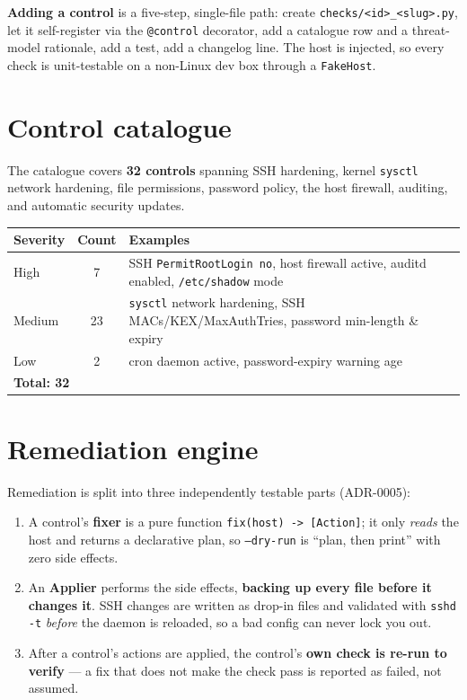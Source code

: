 \documentclass[11pt,a4paper]{article}
\begin{document}
\noindent\textbf{Adding a control} is a five-step, single-file path: create
\texttt{checks/<id>\_<slug>.py}, let it self-register via the \texttt{@control} decorator, add a
catalogue row and a threat-model rationale, add a test, add a changelog line. The host is
injected, so every check is unit-testable on a non-Linux dev box through a \texttt{FakeHost}.

\section{Control catalogue}
The catalogue covers \textbf{32 controls} spanning SSH hardening, kernel \texttt{sysctl} network
hardening, file permissions, password policy, the host firewall, auditing, and automatic
security updates.

\begin{center}
\renewcommand{\arraystretch}{1.25}
\begin{tabular}{l c p{8.2cm}}
\toprule
\textbf{Severity} & \textbf{Count} & \textbf{Examples} \\
\midrule
High   & 7  & SSH \texttt{PermitRootLogin no}, host firewall active, auditd enabled, \texttt{/etc/shadow} mode \\
Medium & 23 & \texttt{sysctl} network hardening, SSH MACs/KEX/MaxAuthTries, password min-length \& expiry \\
Low    & 2  & cron daemon active, password-expiry warning age \\
\midrule
\multicolumn{2}{l}{\textbf{Total: 32}} & \\
\bottomrule
\end{tabular}
\end{center}

\section{Remediation engine}
Remediation is split into three independently testable parts (ADR-0005):

\begin{enumerate}[leftmargin=1.5em,itemsep=2pt]
  \item A control's \textbf{fixer} is a pure function \texttt{fix(host) -> [Action]}; it only
        \emph{reads} the host and returns a declarative plan, so \texttt{--dry-run} is ``plan,
        then print'' with zero side effects.
  \item An \textbf{Applier} performs the side effects, \textbf{backing up every file before it
        changes it}. SSH changes are written as drop-in files and validated with
        \texttt{sshd -t} \emph{before} the daemon is reloaded, so a bad config can never lock
        you out.
  \item After a control's actions are applied, the control's \textbf{own check is re-run to
        verify} --- a fix that does not make the check pass is reported as failed, not assumed.
\end{enumerate}
\end{document}

